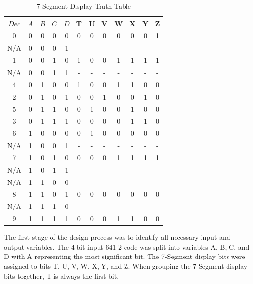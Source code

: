 \documentclass[12pt,letterpaper,titlepage]{article}
\begin{document}
\begin{raggedright}
\begin{table}
\centering
\begin{tabular}{|c||c|c|c|c||c|c|c|c|c|c|c|}\hline
$Dec$ & $A$ & $B$ & $C$ & $D$ & T & U & V & W & X & Y & Z\\\hline\hline
0         & 0   & 0   & 0   & 0   & 0 & 0 & 0 & 0 & 0 & 0 & 1\\\hline
N/A       & 0   & 0   & 0   & 1   & - & - & - & - & - & - & -\\\hline
1         & 0   & 0   & 1   & 0   & 1 & 0 & 0 & 1 & 1 & 1 & 1\\\hline
N/A       & 0   & 0   & 1   & 1   & - & - & - & - & - & - & -\\\hline
4         & 0   & 1   & 0   & 0   & 1 & 0 & 0 & 1 & 1 & 0 & 0\\\hline
2         & 0   & 1   & 0   & 1   & 0 & 0 & 1 & 0 & 0 & 1 & 0\\\hline
5         & 0   & 1   & 1   & 0   & 0 & 1 & 0 & 0 & 1 & 0 & 0\\\hline
3         & 0   & 1   & 1   & 1   & 0 & 0 & 0 & 0 & 1 & 1 & 0\\\hline
6         & 1   & 0   & 0   & 0   & 0 & 1 & 0 & 0 & 0 & 0 & 0\\\hline
N/A       & 1   & 0   & 0   & 1   & - & - & - & - & - & - & -\\\hline
7         & 1   & 0   & 1   & 0   & 0 & 0 & 0 & 1 & 1 & 1 & 1\\\hline
N/A       & 1   & 0   & 1   & 1   & - & - & - & - & - & - & -\\\hline
N/A       & 1   & 1   & 0   & 0   & - & - & - & - & - & - & -\\\hline
8         & 1   & 1   & 0   & 1   & 0 & 0 & 0 & 0 & 0 & 0 & 0\\\hline
N/A       & 1   & 1   & 1   & 0   & - & - & - & - & - & - & -\\\hline
9         & 1   & 1   & 1   & 1   & 0 & 0 & 0 & 1 & 1 & 0 & 0\\\hline
\end{tabular}
\caption{7 Segment Display Truth Table}
\end{table}
The first stage of the design process was to identify all necessary input and output variables. The 4-bit input 641-2 code was split into variables A, B, C, and D with A representing the most significant bit. The 7-Segment display bits were assigned to bits T, U, V, W, X, Y, and Z. When grouping the 7-Segment display bits together, T is always the first bit.


\end{raggedright}
\end{document}
